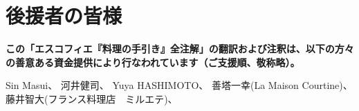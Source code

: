 \hypertarget{benefactors}{%
\section{後援者の皆様}\label{benefactors}}

\thispagestyle{empty}

\small

\textbf{この「エスコフィエ『料理の手引き』全注解」の翻訳および注釈は、以下の方々の善意ある資金提供により行なわれています（ご支援順、敬称略）。}

\normalsize

Sin Masui、\href{20180524-23h,2x,novelsoundsmail@gmail.com}{}
河井健司、\href{20180525-0h14,10x,kwibeng@gmail.com}{} Yuya
HASHIMOTO、\href{20180525-1h40,2x,hashimo0910@gmail.com}{} 善塔一幸(La
Maison
Courtine)、\href{20180525-8h56,10x,kazuyukizento120@docomo.ne.jp}{}
藤井智大(フランス料理店　ミルエテ)、\href{20180525-10h07,1x,apple19761019@yahoo.co.jp}{}
